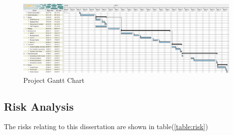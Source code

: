 \documentclass[12pt]{article}  %
\theoremstyle{definition}
\theoremstyle{remark}
\begin{document}
\begin{figure}[!htbp]

\includegraphics[width=\textwidth]{images/ganttchart.png}
\caption{Project Gantt Chart}
\label{fig:ganttchart}

\end{figure}






\subsection{Risk Analysis}
 
The risks relating to this dissertation are shown in table(\ref{table:risk})
\end{document}
